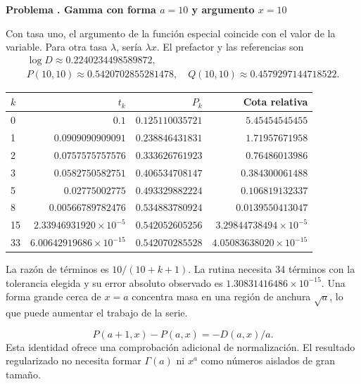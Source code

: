 \documentclass[11pt,a4paper]{article}
\theoremstyle{definition}
\newcounter{problema}
\newenvironment{resuelto}[1]{\refstepcounter{problema}\par\medskip\Needspace{6\baselineskip}\textbf{Problema \theproblema. #1}\par}{\par\medskip}
\begin{document}
\begin{resuelto}{Gamma con forma $a=10$ y argumento $x=10$}
Con tasa uno, el argumento de la función especial coincide con el valor de la variable. Para otra tasa $\lambda$, sería $\lambda x$. El prefactor y las referencias son
\[
\begin{gathered}
\log D\approx0.2240234498589872,\\
P(10,10)\approx0.5420702855281478,\quad Q(10,10)\approx0.4579297144718522.
\end{gathered}
\]

\begin{center}\small\begin{tabular}{lrrr}
\toprule
$k$ & $t_k$ & $P_k$ & Cota relativa\\\midrule
0 & $0.1$ & $0.125110035721$ & $5.45454545455$\\
1 & $0.0909090909091$ & $0.238846431831$ & $1.71957671958$\\
2 & $0.0757575757576$ & $0.333626761923$ & $0.76486013986$\\
3 & $0.0582750582751$ & $0.406534708147$ & $0.384300061488$\\
5 & $0.02775002775$ & $0.493329882224$ & $0.106819132337$\\
8 & $0.00566789782476$ & $0.534883780924$ & $0.0139550413047$\\
15 & $2.33946931920\times10^{-5}$ & $0.542052605256$ & $3.29844738494\times10^{-5}$\\
33 & $6.00642919686\times10^{-15}$ & $0.542070285528$ & $4.05083638020\times10^{-15}$\\
\bottomrule\end{tabular}\end{center}

La razón de términos es $10/(10+k+1)$. La rutina necesita 34 términos con la tolerancia elegida y su error absoluto observado es $1.30831416486\times10^{-15}$. Una forma grande cerca de $x=a$ concentra masa en una región de anchura $\sqrt a$, lo que puede aumentar el trabajo de la serie.

\[
P(a+1,x)-P(a,x)=-D(a,x)/a.
\]
Esta identidad ofrece una comprobación adicional de normalización. El resultado regularizado no necesita formar $\Gamma(a)$ ni $x^a$ como números aislados de gran tamaño.
\end{resuelto}
\end{document}

